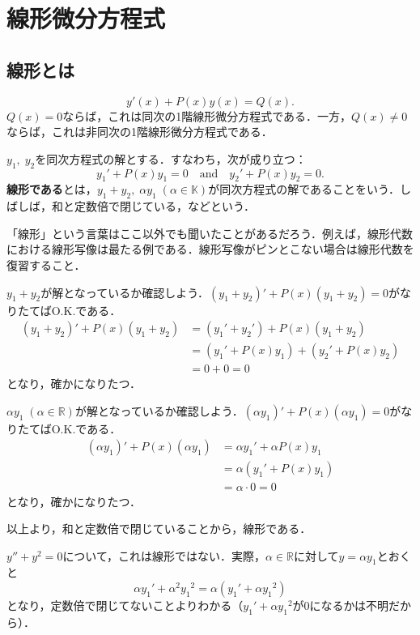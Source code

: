 \section{線形微分方程式} %
\subsection{線形とは}
\begin{equation}
    y'(x) + P(x)y(x) = Q(x). \label{eq:1order-lode}
\end{equation}
$Q(x)=0$ならば，これは同次の1階線形微分方程式である．一方，$Q(x) \neq 0$ならば，これは非同次の1階線形微分方程式である．

\begin{note*}[線形とは]
    $y_1,\; y_2$を同次方程式の解とする．すなわち，次が成り立つ：
    \[ y_1' + P(x)y_1 = 0 \quad \text{and} \quad y_2' +  P(x)y_2 = 0.\]
    \textbf{線形である}とは，$y_1+y_2, \; \alpha y_1 \; (\alpha \in \mathbb{K})$が同次方程式の解であることをいう．しばしば，和と定数倍で閉じている，などという．

    「線形」という言葉はここ以外でも聞いたことがあるだろう．例えば，線形代数における線形写像は最たる例である．線形写像がピンとこない場合は線形代数を復習すること．
\end{note*}

$y_1+y_2$が解となっているか確認しよう．$(y_1+y_2)'+P(x)(y_1+y_2)=0$がなりたてばO.K.である．
\begin{align*}
    (y_1+y_2)'+P(x)(y_1+y_2) &= (y_1'+y_2')+P(x)(y_1+y_2) \\
    &= (y_1'+P(x)y_1)+(y_2'+P(x)y_2) \\
    &= 0+0 = 0
\end{align*}
となり，確かになりたつ．

$\alpha y_1 \; (\alpha \in \mathbb{R})$が解となっているか確認しよう．$(\alpha y_1)'+P(x)(\alpha y_1)=0$がなりたてばO.K.である．
\begin{align*}
    (\alpha y_1)'+P(x)(\alpha y_1) &= \alpha y_1' + \alpha P(x)y_1 \\
    &= \alpha (y_1' + P(x)y_1) \\
    &= \alpha \cdot 0 =0
\end{align*}
となり，確かになりたつ．

以上より，和と定数倍で閉じていることから，線形である．

\begin{example}[線形ではない例]
    $y''+y^2=0$について，これは線形ではない．実際，$\alpha \in \mathbb{R}$に対して$y=\alpha y_1$とおくと
    \[ \alpha y_1' + \alpha^2 {y_1}^2 = \alpha (y_1' + \alpha {y_1}^2)\]
    となり，定数倍で閉じてないことよりわかる（$y_1' + \alpha {y_1}^2$が0になるかは不明だから）．
\end{example}

